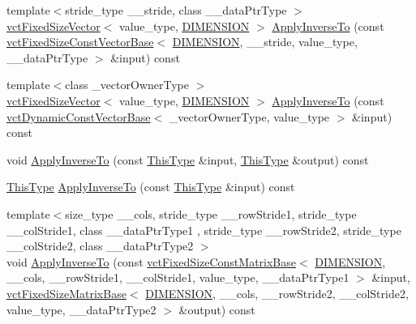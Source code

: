 \begin{DoxyCompactItemize}
\item 
{\footnotesize template$<$stride\+\_\+type \+\_\+\+\_\+stride, class \+\_\+\+\_\+data\+Ptr\+Type $>$ }\\\hyperlink{classvct_fixed_size_vector}{vct\+Fixed\+Size\+Vector}$<$ value\+\_\+type, \hyperlink{classvct_frame_base_a4284a4e875533c13df90a20c0233e043ad25b85efd5e4c2687ddf38ae18cd88f0}{D\+I\+M\+E\+N\+S\+I\+O\+N} $>$ \hyperlink{classvct_frame_base_a44d31464805db9f669600d412154e91e}{Apply\+Inverse\+To} (const \hyperlink{classvct_fixed_size_const_vector_base}{vct\+Fixed\+Size\+Const\+Vector\+Base}$<$ \hyperlink{classvct_frame_base_a4284a4e875533c13df90a20c0233e043ad25b85efd5e4c2687ddf38ae18cd88f0}{D\+I\+M\+E\+N\+S\+I\+O\+N}, \+\_\+\+\_\+stride, value\+\_\+type, \+\_\+\+\_\+data\+Ptr\+Type $>$ \&input) const 
\item 
{\footnotesize template$<$class \+\_\+vector\+Owner\+Type $>$ }\\\hyperlink{classvct_fixed_size_vector}{vct\+Fixed\+Size\+Vector}$<$ value\+\_\+type, \hyperlink{classvct_frame_base_a4284a4e875533c13df90a20c0233e043ad25b85efd5e4c2687ddf38ae18cd88f0}{D\+I\+M\+E\+N\+S\+I\+O\+N} $>$ \hyperlink{classvct_frame_base_a2ffc89a6a4e34d229f95cf452c2254d2}{Apply\+Inverse\+To} (const \hyperlink{classvct_dynamic_const_vector_base}{vct\+Dynamic\+Const\+Vector\+Base}$<$ \+\_\+vector\+Owner\+Type, value\+\_\+type $>$ \&input) const 
\item 
void \hyperlink{classvct_frame_base_a02f7ea3175a0b3b10afcfdb410246f9d}{Apply\+Inverse\+To} (const \hyperlink{classvct_frame_base_a076f1fe4fc957faa0d1ff7450d1cb768}{This\+Type} \&input, \hyperlink{classvct_frame_base_a076f1fe4fc957faa0d1ff7450d1cb768}{This\+Type} \&output) const 
\item 
\hyperlink{classvct_frame_base_a076f1fe4fc957faa0d1ff7450d1cb768}{This\+Type} \hyperlink{classvct_frame_base_a907aab0c6eca388f17777aca5a54ef45}{Apply\+Inverse\+To} (const \hyperlink{classvct_frame_base_a076f1fe4fc957faa0d1ff7450d1cb768}{This\+Type} \&input) const 
\item 
{\footnotesize template$<$size\+\_\+type \+\_\+\+\_\+cols, stride\+\_\+type \+\_\+\+\_\+row\+Stride1, stride\+\_\+type \+\_\+\+\_\+col\+Stride1, class \+\_\+\+\_\+data\+Ptr\+Type1 , stride\+\_\+type \+\_\+\+\_\+row\+Stride2, stride\+\_\+type \+\_\+\+\_\+col\+Stride2, class \+\_\+\+\_\+data\+Ptr\+Type2 $>$ }\\void \hyperlink{classvct_frame_base_ab17c241813dac96239995cacfbd9c9a2}{Apply\+Inverse\+To} (const \hyperlink{classvct_fixed_size_const_matrix_base}{vct\+Fixed\+Size\+Const\+Matrix\+Base}$<$ \hyperlink{classvct_frame_base_a4284a4e875533c13df90a20c0233e043ad25b85efd5e4c2687ddf38ae18cd88f0}{D\+I\+M\+E\+N\+S\+I\+O\+N}, \+\_\+\+\_\+cols, \+\_\+\+\_\+row\+Stride1, \+\_\+\+\_\+col\+Stride1, value\+\_\+type, \+\_\+\+\_\+data\+Ptr\+Type1 $>$ \&input, \hyperlink{classvct_fixed_size_matrix_base}{vct\+Fixed\+Size\+Matrix\+Base}$<$ \hyperlink{classvct_frame_base_a4284a4e875533c13df90a20c0233e043ad25b85efd5e4c2687ddf38ae18cd88f0}{D\+I\+M\+E\+N\+S\+I\+O\+N}, \+\_\+\+\_\+cols, \+\_\+\+\_\+row\+Stride2, \+\_\+\+\_\+col\+Stride2, value\+\_\+type, \+\_\+\+\_\+data\+Ptr\+Type2 $>$ \&output) const 

\end{DoxyCompactItemize}
